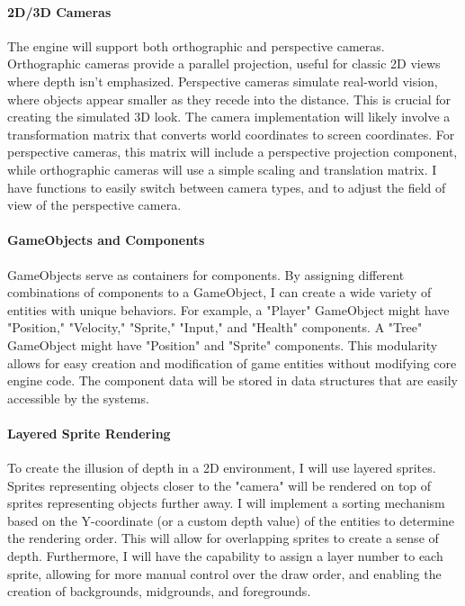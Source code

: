 \documentclass{article}
\begin{document}
\paragraph{2D/3D Cameras}
The engine will support both orthographic and perspective cameras. Orthographic cameras provide a parallel projection, useful for classic 2D views where depth isn't emphasized. Perspective cameras simulate real-world vision, where objects appear smaller as they recede into the distance. This is crucial for creating the simulated 3D look. The camera implementation will likely involve a transformation matrix that converts world coordinates to screen coordinates. For perspective cameras, this matrix will include a perspective projection component, while orthographic cameras will use a simple scaling and translation matrix. I have functions to easily switch between camera types, and to adjust the field of view of the perspective camera.

\paragraph{GameObjects and Components}
GameObjects serve as containers for components. By assigning different combinations of components to a GameObject, I can create a wide variety of entities with unique behaviors. For example, a "Player" GameObject might have "Position," "Velocity," "Sprite," "Input," and "Health" components. A "Tree" GameObject might have "Position" and "Sprite" components. This modularity allows for easy creation and modification of game entities without modifying core engine code. The component data will be stored in data structures that are easily accessible by the systems.

\paragraph{Layered Sprite Rendering}
To create the illusion of depth in a 2D environment, I will use layered sprites. Sprites representing objects closer to the "camera" will be rendered on top of sprites representing objects further away. I will implement a sorting mechanism based on the Y-coordinate (or a custom depth value) of the entities to determine the rendering order. This will allow for overlapping sprites to create a sense of depth. Furthermore, I will have the capability to assign a layer number to each sprite, allowing for more manual control over the draw order, and enabling the creation of backgrounds, midgrounds, and foregrounds.
\end{document}
